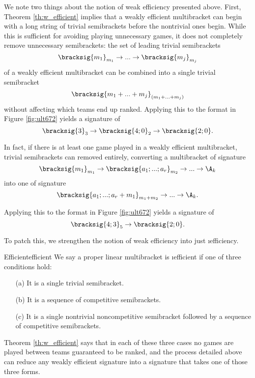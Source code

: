 {    

    We note two things about the notion of weak efficiency presented above. First, Theorem \ref{th:w_efficient} implies that a weakly efficient multibracket can begin with a long string of trivial semibrackets before the nontrivial ones begin. While this is sufficient for avoiding playing unnecessary games, it does not completely remove unnecessary semibrackets: the set of leading trivial semibrackets $$\bracksig{m_1}_{m_1} \to ... \to \bracksig{m_{j}}_{m_{j}}$$ of a weakly efficient multibracket can be combined into a single trivial semibracket $$\bracksig{m_1 + ... + m_{j}}_{(m_1 + ... + m_{j})}$$ without affecting which teams end up ranked. Applying this to the format in Figure \ref{fig:ult672} yields a signature of $$\bracksig{3}_3 \to \bracksig{4;0}_2 \to \bracksig{2;0}.$$ 
    
    In fact, if there is at least one game played in a weakly efficient multibracket, trivial semibrackets can removed entirely, converting a multibracket of signature $$\bracksig{m_1}_{m_1} \to \bracksig{a_1; ...; a_r}_{m_2} \to ... \to \A_k$$ into one of signature $$\bracksig{a_1; ...; a_r + m_1}_{m_1 + m_2} \to ... \to \A_k.$$ 
    
    Applying this to the format in Figure \ref{fig:ult672} yields a signature of $$\bracksig{4;3}_5 \to \bracksig{2;0}.$$

    To patch this, we strengthen the notion of weak efficiency into just \i{efficiency.}

    \begin{definition}{Efficient}{efficient}
        We say a proper linear multibracket is \i{efficient} if one of three conditions hold:
        \begin{enumerate}
            \item[(a)] It is a single trivial semibracket.
            \item[(b)] It is a sequence of competitive semibrackets.
            \item[(c)] It is a single nontrivial noncompetitive semibracket followed by a sequence of competitive semibrackets.
        \end{enumerate}
    \end{definition}

    Theorem \ref{th:w_efficient} says that in each of these three cases no games are played between teams guaranteed to be ranked, and the process detailed above can reduce any weakly efficient signature into a signature that takes one of those three forms.

}
